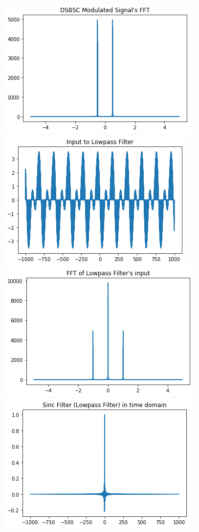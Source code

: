 \documentclass[12pt,a4paper]{article}%
\begin{document}
\begin{flushleft}
\begin{center}
		{\includegraphics[width=0.80 \textwidth]{./images/modu_fft1.PNG}}
		{\includegraphics[width=0.80 \textwidth]{./images/inp_lpf1.PNG}}\\\bigskip
		{\includegraphics[width=0.80 \textwidth]{./images/inp_lpf_fft1.PNG}}
		{\includegraphics[width=0.80 \textwidth]{./images/sinc1.PNG}}\\\bigskip

\end{center}
\end{flushleft}
\end{document}
